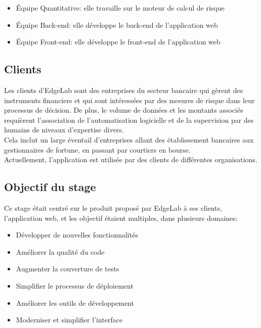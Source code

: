 \documentclass[a4paper,french,12pt]{article}
\begin{document}
	\begin{itemize}
	\item \'Equipe Quantitative: elle travaille sur le moteur de calcul de risque
	\item \'Equipe Back-end: elle développe le back-end de l'application web
	\item \'Equipe Front-end: elle développe le front-end de l'application web
	\end{itemize}

	\subsection{Clients}

		Les clients d'EdgeLab sont des entreprises du secteur bancaire qui gèrent des instruments financiers et qui sont intéressées par des mesures de risque dans leur processus de décision. De plus, le volume de données et les montants associés requièrent l'association de l'automatisation logicielle et de la supervision par des humains de niveaux d'expertise divers.~\\	
		
	Cela inclut un large éventail d'entreprises allant des établissement bancaires aux gestionnaires de fortune, en passant par courtiers en bourse.~\\	
	
	Actuellement, l'application est utilisée par des clients de différentes organisations. 
	
	\subsection{Objectif du stage}

		Ce stage était centré sur le produit proposé par EdgeLab à ses clients, l'application web, et les objectif étaient multiples, dans plusieurs domaines:~\\	
		
	\begin{itemize}
		\item Développer de nouvelles fonctionnalités
		\item Améliorer la qualité du code
		\item Augmenter la couverture de tests
		\item Simplifier le processus de déploiement
		\item Améliorer les outils de développement
		\item Moderniser et simplifier l'interface
	\end{itemize}			
\end{document}
